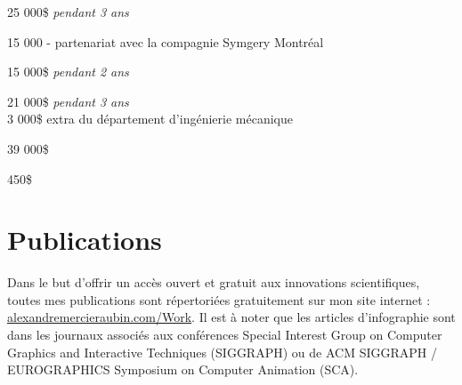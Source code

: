 \documentclass[10pt]{article} %
\begin{document}
{
 25 000\$  \textit{pendant 3 ans}\\
}

{
 15 000 - partenariat avec la compagnie Symgery Montréal\\
}

{
 15 000\$ \textit{pendant 2 ans} \\
}

{
 21 000\$ \textit{pendant 3 ans} \\
 3 000\$ extra du département d'ingénierie mécanique\\
}

{
\textit{} 39 000\$\\
}


{
\textit{} 450\$\\
}

\section{Publications}
Dans le but d'offrir un accès ouvert et gratuit aux innovations scientifiques, toutes mes publications sont répertoriées gratuitement sur mon site internet : \href{https://alexandremercieraubin.com/Work}{alexandremercieraubin.com/Work}. Il est à noter que les articles d'infographie sont dans les journaux associés aux conférences Special Interest Group on Computer Graphics and Interactive Techniques (SIGGRAPH) ou de ACM SIGGRAPH / EUROGRAPHICS Symposium on Computer Animation (SCA).
\end{document}
